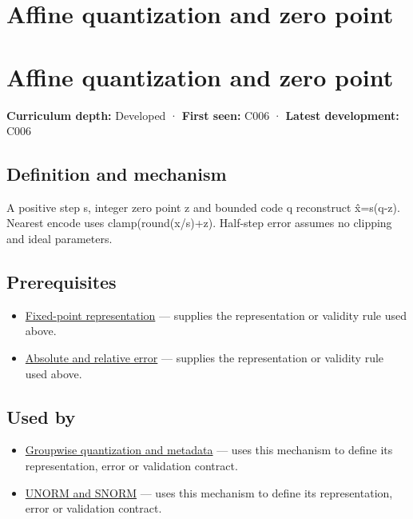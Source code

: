 \hypertarget{appendix-d5da3eaabaef}{}
\section*{Affine quantization and zero point}
\section{Affine quantization and zero point}\label{appendix-d5da3eaabaef-affine-quantization-and-zero-point}

\textbf{Curriculum depth:} Developed · \textbf{First seen:} C006 · \textbf{Latest development:} C006

\subsection{Definition and mechanism}\label{appendix-d5da3eaabaef-definition-and-mechanism}

A positive step s, integer zero point z and bounded code q reconstruct x̂=s(q-z). Nearest encode uses clamp(round(x/s)+z). Half-step error assumes no clipping and ideal parameters.

\subsection{Prerequisites}\label{appendix-d5da3eaabaef-prerequisites}

\begin{itemize}
\tightlist
\item
  \hyperref[appendix-1d0dbe8924cc]{Fixed-point representation} --- supplies the representation or validity rule used above.
\item
  \hyperref[appendix-3ae74e89b4e6]{Absolute and relative error} --- supplies the representation or validity rule used above.
\end{itemize}

\subsection{Used by}\label{appendix-d5da3eaabaef-used-by}

\begin{itemize}
\tightlist
\item
  \hyperref[appendix-638204c40e8b]{Groupwise quantization and metadata} --- uses this mechanism to define its representation, error or validation contract.
\item
  \hyperref[appendix-b2402c453dac]{UNORM and SNORM} --- uses this mechanism to define its representation, error or validation contract.
\end{itemize}

